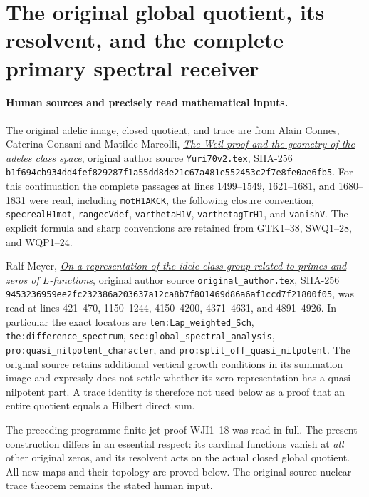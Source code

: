 \section{The original global quotient, its resolvent, and the complete primary spectral receiver}
\label{sec:global-spectral-quotient-resolvent}

\paragraph{Human sources and precisely read mathematical inputs.}
The original adelic image, closed quotient, and trace are from
Alain Connes, Caterina Consani and Matilde Marcolli,
\href{https://arxiv.org/abs/math/0703392v1}{\emph{The Weil proof and
the geometry of the adeles class space}}, original author source
\nolinkurl{Yuri70v2.tex}, SHA-256
\nolinkurl{b1f694cb934dd4fef829287f1a55dd8de21c67a481e552453c2f7e8fe0ae6fb5}.
For this continuation the complete passages at lines 1499--1549,
1621--1681, and 1680--1831 were read, including
\texttt{motH1AKCK}, the following closure convention,
\texttt{specrealH1mot}, \texttt{rangecVdef},
\texttt{varthetaH1V}, \texttt{varthetagTrH1}, and \texttt{vanishV}.
The explicit formula and sharp conventions are retained from
GTK1--38, SWQ1--28, and WQP1--24.

Ralf Meyer,
\href{https://arxiv.org/abs/math/0311468v3}{\emph{On a representation
of the idele class group related to primes and zeros of
$L$-functions}}, original author source
\nolinkurl{original_author.tex}, SHA-256
\nolinkurl{9453236959ee2fc232386a203637a12ca8b7f801469d86a6af1ccd7f21800f05},
was read at lines 421--470, 1150--1244, 4150--4200,
4371--4631, and 4891--4926. In particular the exact locators are
\texttt{lem:Lap\_weighted\_Sch}, \texttt{the:difference\_spectrum},
\texttt{sec:global\_spectral\_analysis},
\texttt{pro:quasi\_nilpotent\_character}, and
\texttt{pro:split\_off\_quasi\_nilpotent}.
The original source retains additional vertical growth conditions
in its summation image and expressly does not settle whether its
zero representation has a quasi-nilpotent part. A trace identity
is therefore not used below as a proof that an entire quotient
equals a Hilbert direct sum.

The preceding programme finite-jet proof WJI1--18 was read in full.
The present construction differs in an essential respect: its
cardinal functions vanish at \emph{all} other original zeros,
and its resolvent acts on the actual closed global quotient.
All new maps and their topology are proved below. The original
source nuclear trace theorem remains the stated human input.

